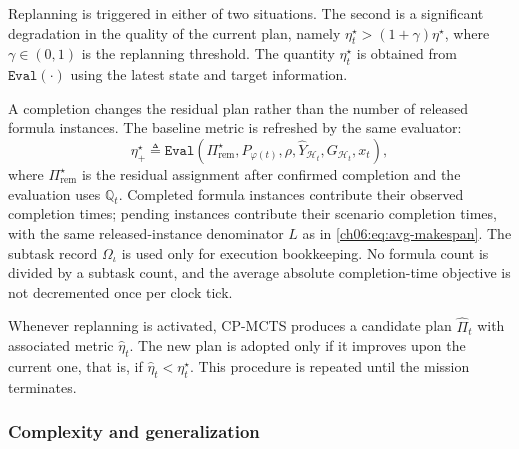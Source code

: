Replanning is triggered in either of two situations.  The second is a significant
degradation in the quality of the current plan, namely
$\eta_t^{\star} > (1+\gamma)\eta^{\star}$, where
$\gamma \in (0,1)$ is the replanning threshold. The quantity
$\eta_t^{\star}$ is obtained from $\texttt{Eval}(\cdot)$ using the
latest state and target information. \begin{revision}
A completion changes the residual plan rather than the number of released
formula instances. The baseline metric is refreshed by the same evaluator:
\begin{equation}
\label{ch06:eq:update_eta}
\eta_+^\star\triangleq
\texttt{Eval}(\Pi_{\mathrm{rem}}^\star,P_{\varphi(t)},\rho,
\widehat Y_{\mathcal H_t},G_{\mathcal H_t},x_t),
\end{equation}
where $\Pi_{\mathrm{rem}}^\star$ is the residual assignment after confirmed
completion and the evaluation uses $\mathbb Q_t$.
Completed formula instances contribute their observed completion times;
pending instances contribute their scenario completion times, with the same
released-instance denominator $L$ as in \eqref{ch06:eq:avg-makespan}.
The subtask record $\Omega_\iota$ is used only for execution bookkeeping.
No formula count is divided by a subtask count, and the average absolute
completion-time objective is not decremented once per clock tick.
\end{revision}
Whenever replanning is activated, CP-MCTS produces a candidate plan
$\widehat{\Pi}_t$ with associated metric $\widehat{\eta}_t$. The new
plan is adopted only if it improves upon the current one, that is, if
$\widehat{\eta}_t < \eta_t^{\star}$.  This procedure
is repeated until the mission terminates.

\subsubsection{Complexity and generalization}

